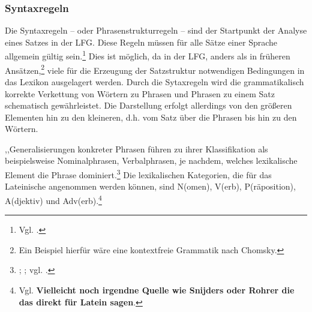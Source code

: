 \documentclass[12pt,a4paper]{article}
\begin{document}
\subsubsection{Syntaxregeln}
Die Syntaxregeln -- oder Phrasenstrukturregeln -- sind der Startpunkt der Analyse eines Satzes in der LFG. Diese Regeln müssen für alle Sätze einer Sprache allgemein gültig sein.\footnote{Vgl. \cite[47]{Dal}.} Dies ist möglich, da in der LFG, anders als in früheren Ansätzen,\footnote{Ein Beispiel hierfür wäre eine kontextfreie Grammatik nach Chomsky.} viele für die Erzeugung der Satzstruktur notwendigen Bedingungen in das Lexikon ausgelagert werden. Durch die Sytaxregeln wird die grammatikalisch korrekte Verkettung von Wörtern zu Phrasen und Phrasen zu einem Satz schematisch gewährleistet. Die Darstellung erfolgt allerdings von den größeren Elementen hin zu den kleineren, d.h. vom Satz über die Phrasen bis hin zu den Wörtern. 

,,Generalisierungen konkreter Phrasen führen zu ihrer Klassifikation als beispielsweise Nominalphrasen, Verbalphrasen, je nachdem, welches lexikalische Element die Phrase dominiert.\footnote{\cite[47]{Dal}; \cite[53; 58-9]{Dal}; vgl. \cite[15]{Rohrer}.} Die lexikalischen Kategorien, die für das Lateinische angenommen werden können, sind N(omen), V(erb), P(räposition), A(djektiv) und Adv(erb).\footnote{Vgl. \cite[46; 52]{Dal} \textbf{Vielleicht noch irgendne Quelle wie Snijders oder Rohrer die das direkt für Latein sagen}.}
\end{document}
